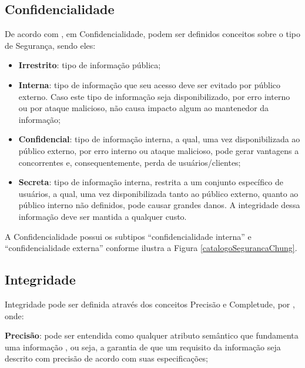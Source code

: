 \subsection{Confidencialidade}
\label{subsec:confidencialidade}

De acordo com \cite{reis10classificaccao}, em Confidencialidade, podem ser definidos conceitos sobre o tipo de Segurança, sendo eles:

\begin{itemize}
	\item \textbf{Irrestrito}: tipo de informação pública; 
	
	\item \textbf{Interna}: tipo de informação que seu acesso deve ser evitado por público externo. Caso este tipo de informação seja disponibilizado, por erro interno ou por ataque malicioso, não causa impacto algum ao mantenedor da informação;
	
	\item \textbf{Confidencial}: tipo de informação interna, a qual, uma vez disponibilizada ao público externo, por erro interno ou ataque malicioso, pode gerar vantagens a concorrentes e, consequentemente, perda de usuários/clientes; 
	
	\item \textbf{Secreta}: tipo de informação interna, restrita a um conjunto específico de usuários, a qual, uma vez disponibilizada tanto ao público externo, quanto ao público interno não definidos, pode causar grandes danos. A integridade dessa informação deve ser mantida a qualquer custo.
\end{itemize} 

A Confidencialidade possui os subtipos “confidencialidade interna” e “confidencialidade externa” conforme ilustra a Figura \ref{catalogoSegurancaChung}.
 

\subsection{Integridade}
\label{subsec:integridade}
 
Integridade pode ser definida através dos conceitos Precisão e Completude, por \cite{chung2012non}, onde: 

\textbf{Precisão}: pode ser entendida como qualquer atributo semântico que fundamenta uma informação \cite{chung2012non}, ou seja, a garantia de que um requisito da informação seja descrito com precisão de acordo com suas especificações; 

